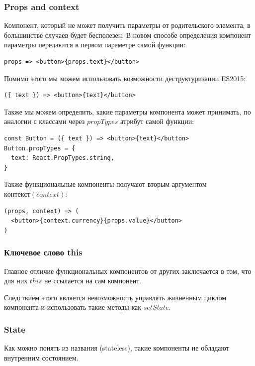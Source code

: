 \subsubsection{Props and context}

Компонент, который не может получить параметры от родительского элемента, в большинстве случаев будет бесполезен. В новом способе определения компонент параметры передаются в первом параметре самой функции:

\begin{lstlisting}
props => <button>{props.text}</button>
\end{lstlisting}

Помимо этого мы можем использовать возможности деструктуризации ES2015:

\begin{lstlisting}
({ text }) => <button>{text}</button>
\end{lstlisting}

Также мы можем определить, какие параметры компонента может принимать, по аналогии с классами через $propTypes$ атрибут самой функции:

\begin{lstlisting}
const Button = ({ text }) => <button>{text}</button>
Button.propTypes = {
  text: React.PropTypes.string,
}
\end{lstlisting}

Также функциональные компоненты получают вторым аргументом $контекст (context)$:

\begin{lstlisting}
(props, context) => (
  <button>{context.currency}{props.value}</button>
)
\end{lstlisting}

\subsubsection{Ключевое слово this}

Главное отличие функциональных компонентов от других заключается в том, что для них $this$ не ссылается на сам компонент.

Следствием этого является невозможность управлять жизненным циклом компонента и использовать такие методы как $setState$.

\subsubsection{State}

Как можно понять из названия (stateless), такие компоненты не обладают внутренним состоянием. 

